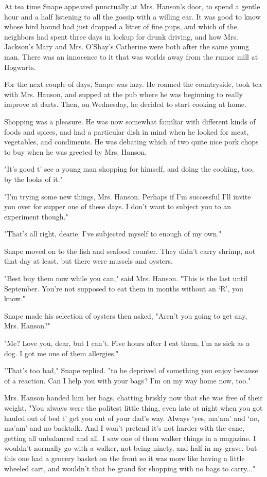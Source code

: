 \documentclass[a4paper,11pt]{article}
\begin{document}
At tea time Snape appeared punctually at Mrs. Hanson's door, to spend a gentle hour and a half listening to all the gossip with a willing ear. It was good to know whose bird hound had just dropped a litter of fine pups, and which of the neighbors had spent three days in lockup for drunk driving, and how Mrs. Jackson's Mary and Mrs. O'Shay's Catherine were both after the same young man. There was an innocence to it that was worlds away from the rumor mill at Hogwarts.

For the next couple of days, Snape was lazy. He roamed the countryside, took tea with Mrs. Hanson, and supped at the pub where he was beginning to really improve at darts. Then, on Wednesday, he decided to start cooking at home.

Shopping was a pleasure. He was now somewhat familiar with different kinds of foods and spices, and had a particular dish in mind when he looked for meat, vegetables, and condiments. He was debating which of two quite nice pork chops to buy when he was greeted by Mrs. Hanson.

"It's good t' see a young man shopping for himself, and doing the cooking, too, by the looks of it."

"I'm trying some new things, Mrs. Hanson. Perhaps if I'm successful I'll invite you over for supper one of these days. I don't want to subject you to an experiment though."

"That's all right, dearie. I've subjected myself to enough of my own."

Snape moved on to the fish and seafood counter. They didn't carry shrimp, not that day at least, but there were mussels and oysters.

"Best buy them now while you can," said Mrs. Hanson. "This is the last until September. You're not supposed to eat them in months without an `R', you know."

Snape made his selection of oysters then asked, "Aren't you going to get any, Mrs. Hanson?"

"Me? Love you, dear, but I can't. Five hours after I eat them, I'm as sick as a dog. I got me one of them allergies."

"That's too bad," Snape replied. "to be deprived of something you enjoy because of a reaction. Can I help you with your bags? I'm on my way home now, too."

Mrs. Hanson handed him her bags, chatting briskly now that she was free of their weight. "You always were the politest little thing, even late at night when you got hauled out of bed t' get you out of your dad's way. Always `yes, ma'am' and `no, ma'am' and no backtalk. And I won't pretend it's not harder with the cane, getting all unbalanced and all. I saw one of them walker things in a magazine. I wouldn't normally go with a walker, not being ninety, and half in my grave, but this one had a grocery basket on the front so it was more like having a little wheeled cart, and wouldn't that be grand for shopping with no bags to carry..."
\end{document}
